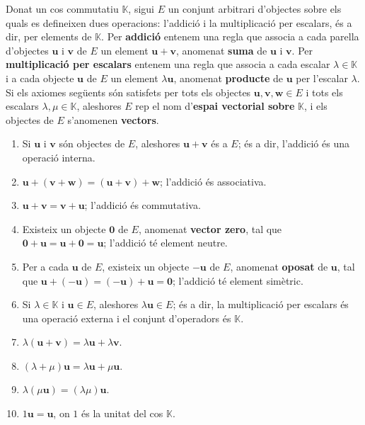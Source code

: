 \begin{definicio}
Donat un cos commutatiu $\mathbb{K}$, sigui $E$ un conjunt arbitrari d’objectes sobre els quals es defineixen dues operacions: l’addició i la multiplicació per escalars, és a dir, per elements de $\mathbb{K}$. Per \textbf{addició} entenem una regla que associa a cada parella d’objectes $\mathbf{u}$ i $\mathbf{v}$ de $E$ un element $\mathbf{u}+\mathbf{v}$, anomenat \textbf{suma} de $\mathbf{u}$ i $\mathbf{v}$. Per \textbf{multiplicació per escalars} entenem una regla que associa a cada escalar $\lambda\in\mathbb{K}$ i a cada objecte $\mathbf{u}$ de $E$ un element $\lambda\mathbf{u}$, anomenat \textbf{producte} de $\mathbf{u}$ per l’escalar $\lambda$. Si els axiomes següents són satisfets per tots els objectes $\mathbf{u},\mathbf{v},\mathbf{w}\in E$ i tots els escalars $\lambda,\mu\in\mathbb{K}$, aleshores $E$ rep el nom d’\textbf{espai vectorial sobre} $\mathbb{K}$, i els objectes de $E$ s’anomenen \textbf{vectors}.

\begin{enumerate}
\item Si $\mathbf{u}$ i $\mathbf{v}$ són objectes de $E$, aleshores $\mathbf{u}+\mathbf{v}$ és a $E$; és a dir, l’addició és una operació interna.
\item $\mathbf{u}+(\mathbf{v}+\mathbf{w})=(\mathbf{u}+\mathbf{v})+\mathbf{w}$; l’addició és associativa.
\item $\mathbf{u}+\mathbf{v}=\mathbf{v}+\mathbf{u}$; l’addició és commutativa.
\item Existeix un objecte $\mathbf{0}$ de $E$, anomenat \textbf{vector zero}, tal que $\mathbf{0}+\mathbf{u}=\mathbf{u}+\mathbf{0}=\mathbf{u}$; l’addició té element neutre.
\item Per a cada $\mathbf{u}$ de $E$, existeix un objecte $-\mathbf{u}$ de $E$, anomenat \textbf{oposat} de $\mathbf{u}$, tal que $\mathbf{u}+(-\mathbf{u})=(-\mathbf{u})+\mathbf{u}=\mathbf{0}$; l’addició té element simètric.
\item Si $\lambda\in\mathbb{K}$ i $\mathbf{u}\in E$, aleshores $\lambda\mathbf{u}\in E$; és a dir, la multiplicació per escalars és una operació externa i el conjunt d’operadors és $\mathbb{K}$.
\item $\lambda (\mathbf{u}+\mathbf{v})=\lambda \mathbf{u}+\lambda \mathbf{v}$.
\item $(\lambda +\mu )\mathbf{u}=\lambda \mathbf{u}+\mu \mathbf{u}$.
\item $\lambda (\mu \mathbf{u})=(\lambda \mu )\mathbf{u}$.
\item $1\mathbf{u}=\mathbf{u}$, on $1$ és la unitat del cos $\mathbb{K}$.
\end{enumerate}
\end{definicio}

